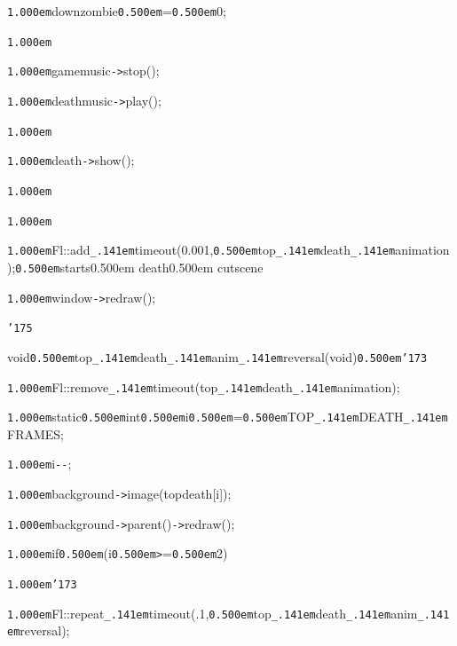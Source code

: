 \documentclass[12pt]{article}
\begin{document}
\noindent
{}{\tt\mc \kern1.000em}downzombie{\tt\mc \kern0.500em}={\tt\mc \kern0.500em}0;

\noindent
{}{\tt\mc \kern1.000em}

\noindent
{}{\tt\mc \kern1.000em}gamemusic{\tt -}{\tt >}stop();

\noindent
{}{\tt\mc \kern1.000em}deathmusic{\tt -}{\tt >}play();

\noindent
{}{\tt\mc \kern1.000em}

\noindent
{}{\tt\mc \kern1.000em}death{\tt -}{\tt >}show();

\noindent
{}{\tt\mc \kern1.000em}

\noindent
{}{\tt\mc \kern1.000em}

\noindent
{}{\tt\mc \kern1.000em}Fl::add{\tt\_\kern.141em}timeout(0.001,{\tt\mc \kern0.500em}top{\tt\_\kern.141em}death{\tt\_\kern.141em}animation);{\tt\mc \kern0.500em}\rm\mc {\tt /}{\tt /}starts\kern0.500em death\kern0.500em cutscene

\noindent
\tt\mc {\tt\mc \kern1.000em}

\noindent
{}{\tt\mc \kern1.000em}window{\tt -}{\tt >}redraw();

\noindent
{}{\tt\char'175}

\noindent
{}\hfill

\noindent
{}void{\tt\mc \kern0.500em}top{\tt\_\kern.141em}death{\tt\_\kern.141em}anim{\tt\_\kern.141em}reversal(void{\tt *}){\tt\mc \kern0.500em}{\tt\char'173}

\noindent
{}{\tt\mc \kern1.000em}Fl::remove{\tt\_\kern.141em}timeout(top{\tt\_\kern.141em}death{\tt\_\kern.141em}animation);

\noindent
{}{\tt\mc \kern1.000em}static{\tt\mc \kern0.500em}int{\tt\mc \kern0.500em}i{\tt\mc \kern0.500em}={\tt\mc \kern0.500em}TOP{\tt\_\kern.141em}DEATH{\tt\_\kern.141em}FRAMES;

\noindent
{}{\tt\mc \kern1.000em}i{\tt -}{\tt -};

\noindent
{}{\tt\mc \kern1.000em}background{\tt -}{\tt >}image(topdeath[i]);

\noindent
{}{\tt\mc \kern1.000em}background{\tt -}{\tt >}parent(){\tt -}{\tt >}redraw();

\noindent
{}{\tt\mc \kern1.000em}if{\tt\mc \kern0.500em}(i{\tt\mc \kern0.500em}{\tt >}={\tt\mc \kern0.500em}2)

\noindent
{}{\tt\mc \kern1.000em}{\tt\char'173}

\noindent
{}{\tt\mc \kern1.000em}Fl::repeat{\tt\_\kern.141em}timeout(.1,{\tt\mc \kern0.500em}top{\tt\_\kern.141em}death{\tt\_\kern.141em}anim{\tt\_\kern.141em}reversal);
\end{document}
